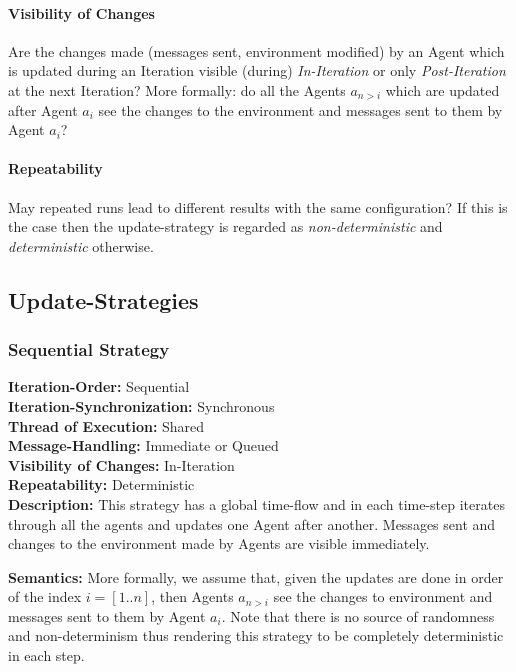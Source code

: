 \paragraph{Visibility of Changes}
Are the changes made (messages sent, environment modified) by an Agent which is updated during an Iteration visible (during) \textit{In-Iteration} or only \textit{Post-Iteration} at the next Iteration? More formally: do all the Agents $a_{n>i}$ which are updated after Agent $a_i$ see the changes to the environment and messages sent to them by Agent $a_i$?

\paragraph{Repeatability}
May repeated runs lead to different results with the same configuration? If this is the case then the update-strategy is regarded as \textit{non-deterministic} and \textit{deterministic} otherwise.



\subsection{Update-Strategies}

\subsubsection{Sequential Strategy}
\textbf{Iteration-Order:} Sequential \\
\textbf{Iteration-Synchronization:}	Synchronous \\
\textbf{Thread of Execution:} Shared \\
\textbf{Message-Handling:} Immediate or Queued \\
\textbf{Visibility of Changes:}	In-Iteration \\
\textbf{Repeatability:}	Deterministic \\
	
\textbf{Description:} This strategy has a global time-flow and in each time-step iterates through all the agents and updates one Agent after another. Messages sent and changes to the environment made by Agents are visible immediately. 

\textbf{Semantics:} More formally, we assume that, given the updates are done in order of the index $i = [1..n]$, then Agents $a_{n>i}$ see the changes to environment and messages sent to them by Agent $a_i$. Note that there is no source of randomness and non-determinism thus rendering this strategy to be completely deterministic in each step. 


